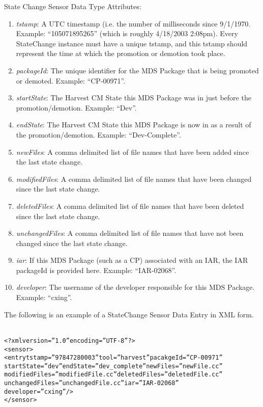 \begin{description}
\item State Change Sensor Data Type Attributes:
\begin{enumerate}
\item \emph{tstamp}: A UTC timestamp (i.e. the number of milliseconds since 
9/1/1970.  Example: ``105071895265'' (which is roughly 4/18/2003
2:08pm). Every StateChange instance must have a unique tstamp, and this
tstamp should represent the time at which the promotion or demotion took
place.
\item \emph{packageId}: The unique identifier for the MDS Package that is
being promoted or demoted.  Example: ``CP-00971''.
\item \emph{startState}: The Harvest CM State this MDS Package was in just
before the promotion/demotion.  Example: ``Dev''.
\item \emph{endState}: The Harvest CM State this MDS Package is now in as a 
result of the promotion/demotion.  Example: ``Dev-Complete''.
\item \emph{newFiles}: A comma delimited list of file names that have been
added since the last state change.
\item \emph{modifiedFiles}: A comma delimited list of file names that have
been changed since the last state change.
\item \emph{deletedFiles}: A comma delimited list of file names that have
been deleted since the last state change.
\item \emph{unchangedFiles}: A comma delimited list of file names that have 
not been changed since the last state change.
\item \emph{iar}: If this MDS Package (such as a CP) associated with an
IAR, the IAR packageId is provided here.  Example: ``IAR-02068''.
\item \emph{developer}: The username of the developer responsible for this
MDS Package.  Example: ``cxing''.
\end{enumerate}
\end{description}

The following is an example of a StateChange Sensor Data Entry in XML form.

\begin{alltt}
{\small{}
<?xml version=''1.0'' encoding=''UTF-8'' ?>
<sensor>
  <entry tstamp=''97847280003'' tool=''harvest'' pacakgeId=''CP-00971''
    startState=''dev'' endState=''dev_complete'' newFiles=''newFile.cc''
    modifiedFiles=''modifiedFile.cc'' deletedFiles=''deletedFile.cc''
    unchangedFiles=''unchangedFile.cc'' iar=''IAR-02068''
    developer=''cxing'' />
</sensor>
}
\end{alltt}


